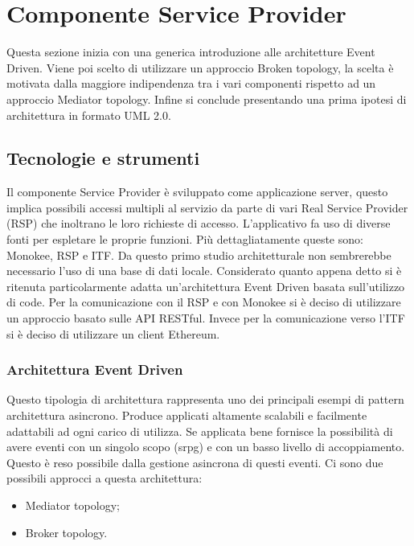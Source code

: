 \newpage
\section{Componente Service Provider}
Questa sezione inizia con una generica introduzione alle architetture Event Driven. Viene poi scelto di utilizzare un approccio Broken topology, la scelta è motivata dalla maggiore indipendenza tra i vari componenti rispetto ad un approccio Mediator topology. Infine si conclude presentando una prima ipotesi di architettura in formato UML 2.0.



\subsection{Tecnologie e strumenti}
\label{sec:tecnologie-strumenti}
Il componente Service Provider è sviluppato come applicazione server, questo implica possibili accessi multipli al servizio da parte di vari Real Service Provider (RSP) che inoltrano le loro richieste di accesso. L’applicativo fa uso di diverse fonti per espletare le proprie funzioni. Più dettagliatamente queste sono: Monokee, RSP e ITF. Da questo primo studio architetturale non sembrerebbe necessario l’uso di una base di dati locale.  Considerato quanto appena detto si è ritenuta particolarmente adatta un’architettura Event Driven basata sull’utilizzo di code. Per la comunicazione con il RSP e con Monokee si è deciso di utilizzare un approccio basato sulle API RESTful. Invece per la comunicazione verso l’ITF si è deciso di utilizzare un client Ethereum.

\subsubsection{Architettura Event Driven}
Questo tipologia di architettura rappresenta uno dei principali esempi di pattern architettura asincrono. Produce applicati altamente scalabili e facilmente adattabili ad ogni carico di utilizza. Se applicata bene fornisce la possibilità di avere eventi con un singolo scopo (\gls{srpg}\glsfirstoccur) e con un basso livello di accoppiamento. Questo è reso possibile dalla gestione asincrona di questi eventi.
Ci sono due possibili approcci a questa architettura:
\begin{itemize}
    \item Mediator topology;
    \item Broker topology.
\end{itemize}
